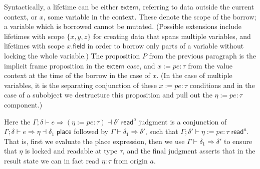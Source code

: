 \documentclass[acmsmall,nonacm]{acmart}
\newcommand{\proves}{\vdash}
\newcommand{\makes}{\dashv}
\begin{document}
Syntactically, a lifetime can be either $\mathsf{extern}$, referring to data outside the current context, or $x$, some variable in the context. These denote the scope of the borrow; a variable which is borrowed cannot be mutated. (Possible extensions include lifetimes with scope $\{x,y,z\}$ for creating data that spans multiple variables, and lifetimes with scope $x.\mathsf{field}$ in order to borrow only parts of a variable without locking the whole variable.) The proposition $P$ from the previous paragraph is the implicit frame proposition in the $\mathsf{extern}$ case, and $x:=pe:\tau$ from the value context at the time of the borrow in the case of $x$. (In the case of multiple variables, it is the separating conjunction of these $x:=pe:\tau$ conditions and in the case of a subobject we destructure this proposition and pull out the $\eta:=pe:\tau$ component.)


Here the $\Gamma;\delta \proves e\Rightarrow(\eta:=pe:\tau)\makes\delta'\;\mathsf{read}^a$ judgment is a conjunction of $\Gamma;\delta \proves e\Rightarrow\eta\makes\delta_1\;\mathsf{place}$ followed by $\Gamma\proves\delta_1 \Rightarrow \delta'$, such that $\Gamma;\delta' \proves \eta:=pe:\tau\;\mathsf{read}^a$. That is, first we evaluate the place expression, then we use $\Gamma\proves\delta_1 \Rightarrow \delta'$ to ensure that $\eta$ is locked and readable at type $\tau$, and the final judgment asserts that in the result state we can in fact read $\eta:\tau$ from origin $a$.
\end{document}
